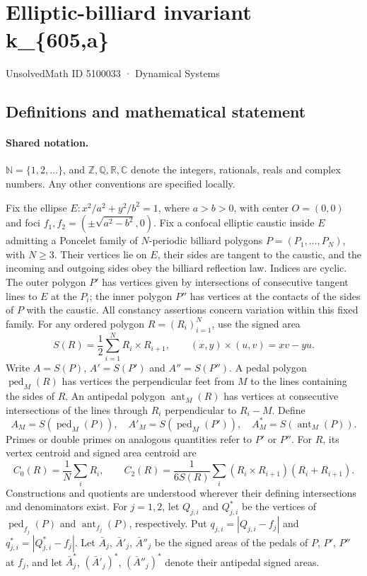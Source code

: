 \documentclass[11pt]{article}
\begin{document}
\setcounter{section}{5100032}
\section{Elliptic-billiard invariant k\_\{605,a\}}\label{5100033}
{\small\sffamily UnsolvedMath ID 5100033 · Dynamical Systems}
\subsection{Definitions and mathematical statement}

\paragraph{Shared notation.}$\mathbb N=\{1,2,\ldots\}$, and $\mathbb Z,\mathbb Q,\mathbb R,\mathbb C$ denote the integers, rationals, reals and complex numbers. Any other conventions are specified locally.


Fix the ellipse $E:x^2/a^2+y^2/b^2=1$, where $a>b>0$, with center $O=(0,0)$ and foci $f_1,f_2=(\pm\sqrt{a^2-b^2},0)$. Fix a confocal elliptic caustic inside $E$ admitting a Poncelet family of $N$-periodic billiard polygons $P=(P_1,\ldots,P_N)$, with $N\geq3$. Their vertices lie on $E$, their sides are tangent to the caustic, and the incoming and outgoing sides obey the billiard reflection law. Indices are cyclic. The outer polygon $P'$ has vertices given by intersections of consecutive tangent lines to $E$ at the $P_i$; the inner polygon $P''$ has vertices at the contacts of the sides of $P$ with the caustic. All constancy assertions concern variation within this fixed family.
For any ordered polygon $R=(R_i)_{i=1}^N$, use the signed area
\[S(R)=\frac12\sum_{i=1}^N R_i\times R_{i+1},\qquad (x,y)\times(u,v)=xv-yu.\]
Write $A=S(P)$, $A'=S(P')$ and $A''=S(P'')$. A pedal polygon $\operatorname{ped}_M(R)$ has vertices the perpendicular feet from $M$ to the lines containing the sides of $R$. An antipedal polygon $\operatorname{ant}_M(R)$ has vertices at consecutive intersections of the lines through $R_i$ perpendicular to $R_i-M$. Define
\[A_M=S(\operatorname{ped}_M(P)),\quad A'_M=S(\operatorname{ped}_M(P')),\quad A_M^*=S(\operatorname{ant}_M(P)).\]
Primes or double primes on analogous quantities refer to $P'$ or $P''$. For $R$, its vertex centroid and signed area centroid are
\[C_0(R)=\frac1N\sum_i R_i,\qquad C_2(R)=\frac{1}{6S(R)}\sum_i(R_i\times R_{i+1})(R_i+R_{i+1}).\]
Constructions and quotients are understood wherever their defining intersections and denominators exist.
For $j=1,2$, let $Q_{j,i}$ and $Q^*_{j,i}$ be the vertices of $\operatorname{ped}_{f_j}(P)$ and $\operatorname{ant}_{f_j}(P)$, respectively. Put $q_{j,i}=|Q_{j,i}-f_j|$ and $q^*_{j,i}=|Q^*_{j,i}-f_j|$. Let $\bar A_j$, $\bar A'_j$, $\bar A''_j$ be the signed areas of the pedals of $P$, $P'$, $P''$ at $f_j$, and let $\bar A_j^*$, $(\bar A'_j)^*$, $(\bar A''_j)^*$ denote their antipedal signed areas.
\end{document}

